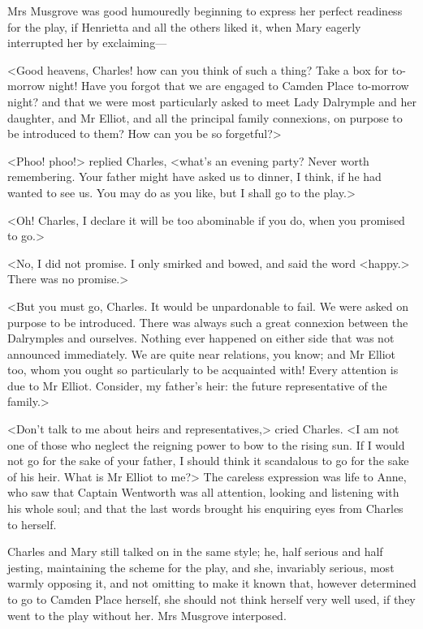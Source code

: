 Mrs Musgrove was good humouredly beginning to express her perfect readiness for the play, if Henrietta and all the others liked it, when Mary eagerly interrupted her by exclaiming—

<Good heavens, Charles! how can you think of such a thing? Take a box for to-morrow night! Have you forgot that we are engaged to Camden Place to-morrow night? and that we were most particularly asked to meet Lady Dalrymple and her daughter, and Mr Elliot, and all the principal family connexions, on purpose to be introduced to them? How can you be so forgetful?>

<Phoo! phoo!> replied Charles, <what's an evening party? Never worth remembering. Your father might have asked us to dinner, I think, if he had wanted to see us. You may do as you like, but I shall go to the play.>

<Oh! Charles, I declare it will be too abominable if you do, when you promised to go.>

<No, I did not promise. I only smirked and bowed, and said the word <happy.> There was no promise.>

<But you must go, Charles. It would be unpardonable to fail. We were asked on purpose to be introduced. There was always such a great connexion between the Dalrymples and ourselves. Nothing ever happened on either side that was not announced immediately. We are quite near relations, you know; and Mr Elliot too, whom you ought so particularly to be acquainted with! Every attention is due to Mr Elliot. Consider, my father's heir: the future representative of the family.>

<Don't talk to me about heirs and representatives,> cried Charles. <I am not one of those who neglect the reigning power to bow to the rising sun. If I would not go for the sake of your father, I should think it scandalous to go for the sake of his heir. What is Mr Elliot to me?> The careless expression was life to Anne, who saw that Captain Wentworth was all attention, looking and listening with his whole soul; and that the last words brought his enquiring eyes from Charles to herself.

Charles and Mary still talked on in the same style; he, half serious and half jesting, maintaining the scheme for the play, and she, invariably serious, most warmly opposing it, and not omitting to make it known that, however determined to go to Camden Place herself, she should not think herself very well used, if they went to the play without her. Mrs Musgrove interposed.

